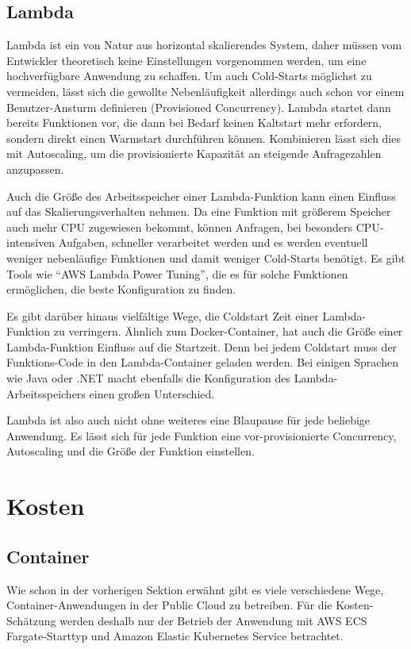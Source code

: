 \subsection{Lambda}
Lambda ist ein von Natur aus horizontal skalierendes System, daher müssen vom Entwickler theoretisch keine Einstellungen vorgenommen werden, um eine hochverfügbare Anwendung zu schaffen. Um auch Cold-Starts möglichst zu vermeiden, lässt sich die gewollte Nebenläufigkeit allerdings auch schon vor einem Benutzer-Ansturm definieren (Provisioned Concurrency). Lambda startet dann bereits Funktionen vor, die dann bei Bedarf keinen Kaltstart mehr erfordern, sondern direkt einen Warmstart durchführen können. Kombinieren lässt sich dies mit Autoscaling, um die provisionierte Kapazität an steigende Anfragezahlen anzupassen. 

Auch die Größe des Arbeitsspeicher einer Lambda-Funktion kann einen Einfluss auf das Skalierungsverhalten nehmen. Da eine Funktion mit größerem Speicher auch mehr CPU zugewiesen bekommt, können Anfragen, bei besonders CPU-intensiven Aufgaben, schneller verarbeitet werden und es werden eventuell weniger nebenläufige Funktionen und damit weniger Cold-Starts benötigt. Es gibt Tools wie "`AWS Lambda Power Tuning"'\cite{casalboni_alexcasalboniaws-lambda-power-tuning_2021}, die es für solche Funktionen ermöglichen, die beste Konfiguration zu finden.

Es gibt darüber hinaus vielfältige Wege, die Coldstart Zeit einer Lambda-Funktion zu verringern. Ähnlich zum Docker-Container, hat auch die Größe einer Lambda-Funktion Einfluss auf die Startzeit. Denn bei jedem Coldstart muss der Funktions-Code in den Lambda-Container geladen werden. Bei einigen Sprachen wie Java oder .NET macht ebenfalls die Konfiguration des Lambda-Arbeitsspeichers einen großen Unterschied\cite{malishev_aws_2019}. 

Lambda ist also auch nicht ohne weiteres eine Blaupause für jede beliebige Anwendung. Es lässt sich für jede Funktion eine vor-provisionierte Concurrency, Autoscaling und die Größe der Funktion einstellen. 

\section{Kosten}

\subsection{Container}
Wie schon in der vorherigen Sektion erwähnt gibt es viele verschiedene Wege, Container-Anwendungen in der Public Cloud zu betreiben. Für die Kosten-Schätzung werden deshalb nur der Betrieb der Anwendung mit AWS ECS Fargate-Starttyp und Amazon Elastic Kubernetes Service betrachtet.

